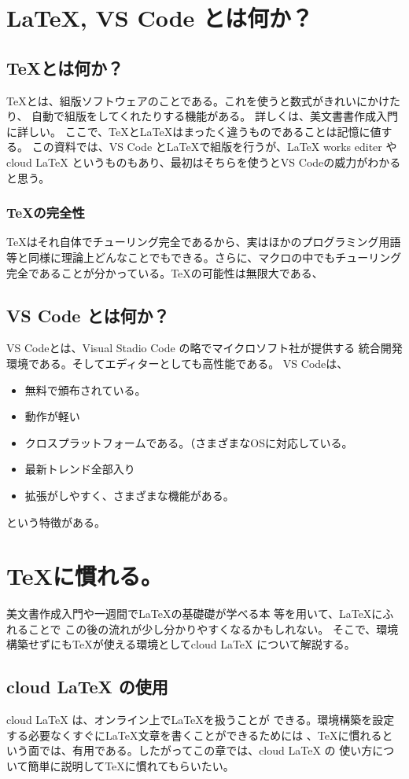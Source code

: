 \documentclass{ltjsarticle}
\begin{document}
\section{\LaTeX , VS Code とは何か？}
\subsection{\TeX とは何か？}
\TeX とは、組版ソフトウェアのことである。これを使うと数式がきれいにかけたり、
自動で組版をしてくれたりする機能がある。
詳しくは、美文書書作成入門\cite{美文書本}に詳しい。
ここで、\TeX と\LaTeX はまったく違うものであることは記憶に値する。
この資料では、VS Code と\LaTeX で組版を行うが、LaTeX works editer やcloud LaTeX 
というものもあり、最初はそちらを使うとVS Codeの威力がわかると思う。
\subsubsection*{\TeX の完全性}
\TeX はそれ自体でチューリング完全であるから、実はほかのプログラミング用語等と同様に理論上どんなことでもできる。さらに、マクロの中でもチューリング完全であることが分かっている。\TeX の可能性は無限大である、
\subsection{VS Code とは何か？}
VS Codeとは、Visual Stadio Code の略でマイクロソフト社が提供する
統合開発環境である。そしてエディターとしても高性能である。
VS Codeは、
\begin{itemize}
  \item 無料で頒布されている。
  \item 動作が軽い
  \item クロスプラットフォームである。（さまざまなOSに対応している。
  \item 最新トレンド全部入り
  \item 拡張がしやすく、さまざまな機能がある。
\end{itemize}
という特徴がある。
\section{\TeX に慣れる。}
美文書作成入門\cite{美文書本}や一週間で\LaTeX の基礎礎が学べる本
\cite{一週間基礎}等を用いて、\LaTeX にふれることで
この後の流れが少し分かりやすくなるかもしれない。
そこで、環境構築せずにも\TeX が使える環境としてcloud LaTeX 
について解説する。
\subsection{cloud LaTeX の使用}
cloud LaTeX は、オンライン上で\LaTeX を扱うことが
できる。環境構築を設定する必要なくすぐにLaTeX文章を書くことができるためには
、TeXに慣れるという面では、有用である。したがってこの章では、cloud LaTeX の
使い方について簡単に説明して\TeX に慣れてもらいたい。
\end{document}
